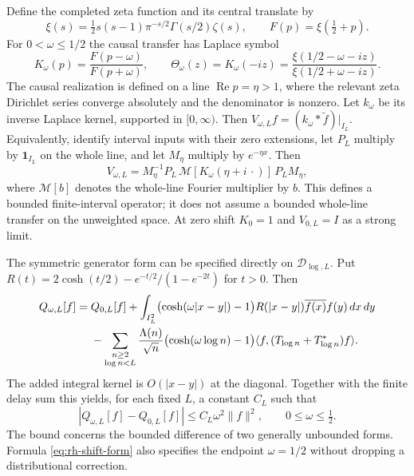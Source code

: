 Define the completed zeta function and its central translate by
\[
\xi(s)=\tfrac12s(s-1)\pi^{-s/2}\Gamma(s/2)\zeta(s),
\qquad F(p)=\xi(\tfrac12+p).
\]
For $0<\omega\leq1/2$ the causal transfer has Laplace symbol
\begin{equation}
K_\omega(p)=\frac{F(p-\omega)}{F(p+\omega)},\qquad
\Theta_\omega(z)=K_\omega(-iz)
=\frac{\xi(1/2-\omega-iz)}{\xi(1/2+\omega-iz)}.
\label{eq:rh-transfer}
\end{equation}
The causal realization is defined on a line $\operatorname{Re}p=\eta>1$,
where the relevant zeta Dirichlet series converge absolutely and the
denominator is nonzero. Let $k_\omega$ be its inverse Laplace kernel,
supported in $[0,\infty)$. Then
$V_{\omega,L}f=(k_\omega*\widetilde f)|_{I_L}$.
Equivalently, identify interval inputs with their zero extensions,
let $P_L$ multiply by $\mathbf1_{I_L}$ on the whole line, and let
$M_\eta$ multiply by $e^{-\eta x}$. Then
\[
V_{\omega,L}
=M_\eta^{-1}P_L\,\mathcal M[K_\omega(\eta+i\,\cdot)]\,P_LM_\eta ,
\]
where $\mathcal M[b]$ denotes the whole-line Fourier multiplier by $b$.
This defines a bounded finite-interval operator; it does not assume a
bounded whole-line transfer on the unweighted space. At zero shift
$K_0=1$ and $V_{0,L}=I$ as a strong limit.

The symmetric generator form can be specified directly on
$\mathcal D_{\log,L}$. Put
$R(t)=2\cosh(t/2)-e^{-t/2}/(1-e^{-2t})$ for $t>0$. Then
\begin{align}
Q_{\omega,L}[f]={}&Q_{0,L}[f]
+\int_{I_L^2}\bigl(\cosh(\omega|x-y|)-1\bigr)R(|x-y|)
\overline{f(x)}f(y)\,dx\,dy \notag\\
&-\sum_{\substack{n\ge2\\\log n<L}}\frac{\Lambda(n)}{\sqrt n}
\bigl(\cosh(\omega\log n)-1\bigr)
\langle f,(T_{\log n}+T_{\log n}^*)f\rangle .
\label{eq:rh-shift-form}
\end{align}
The added integral kernel is $O(|x-y|)$ at the diagonal. Together with
the finite delay sum this yields, for each fixed $L$, a constant $C_L$
such that
\begin{equation}
|Q_{\omega,L}[f]-Q_{0,L}[f]|
\leq C_L\omega^2\lVert f\rVert^2,\qquad 0\leq\omega\leq\tfrac12.
\label{eq:rh-shift-bound}
\end{equation}
The bound concerns the bounded difference of two generally unbounded
forms. Formula \eqref{eq:rh-shift-form} also specifies the endpoint
$\omega=1/2$ without dropping a distributional correction.

